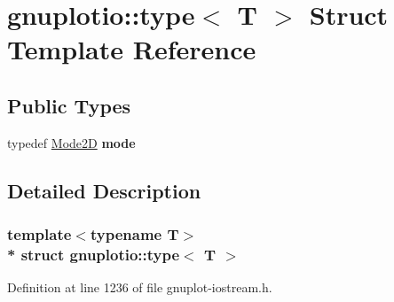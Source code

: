 \hypertarget{structgnuplotio_1_1_mode_auto_decoder_3_01_t_00_01typename_01boost_1_1enable__if__c_3_01_07_arra33ab7f3325313485a7f29355d9a819fc}{}\section{gnuplotio\+:\+:type$<$ T $>$ Struct Template Reference}
\label{structgnuplotio_1_1_mode_auto_decoder_3_01_t_00_01typename_01boost_1_1enable__if__c_3_01_07_arra33ab7f3325313485a7f29355d9a819fc}
\subsection*{Public Types}
\begin{DoxyCompactItemize}
\item 
typedef \hyperlink{structgnuplotio_1_1_mode2_d}{Mode2D} {\bfseries mode}\hypertarget{structgnuplotio_1_1_mode_auto_decoder_3_01_t_00_01typename_01boost_1_1enable__if__c_3_01_07_arra33ab7f3325313485a7f29355d9a819fc_a1574a7286cee13eedaeca8f40e7d0527}{}\label{structgnuplotio_1_1_mode_auto_decoder_3_01_t_00_01typename_01boost_1_1enable__if__c_3_01_07_arra33ab7f3325313485a7f29355d9a819fc_a1574a7286cee13eedaeca8f40e7d0527}

\end{DoxyCompactItemize}


\subsection{Detailed Description}
\subsubsection*{template$<$typename T$>$\\*
struct gnuplotio\+::type$<$ T $>$}



Definition at line 1236 of file gnuplot-\/iostream.\+h.

